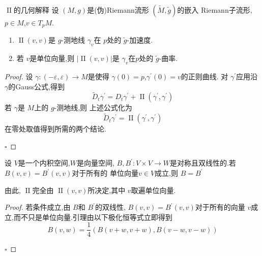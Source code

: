 \documentclass[../../几何与拓扑.tex]{subfiles}
\begin{document}
\begin{proposition}{\(  \operatorname{II}  \)的几何解释}
    设 \(  \left( M,g \right)   \)是(伪)Riemann流形 \(  \left( \tilde{M},\tilde{g}  \right)   \)的嵌入 Riemann子流形, \(  p \in M  \),\(  v\in T_{p}M  \).    
    \begin{enumerate}
        \item \(  \operatorname{II}\left( v,v \right)   \)是 \(  g  \)-测地线 \(   \gamma _v   \)在 \(  p  \)处的 \(  \tilde{g}   \)-加速度.
        \item 若 \(  v  \)是单位向量,则 \(  \left| \operatorname{II}\left( v,v \right)  \right|   \)是 \(   \gamma _v   \)在\(  p  \)处的 \(  \tilde{g}  \)-曲率.          
    \end{enumerate}
    
\end{proposition}
\begin{proof}
    设 \(   \gamma :\left( - \varepsilon , \varepsilon  \right)   \to M\)是使得 \(   \gamma \left( 0 \right)= p   \),\(   \gamma ^{\prime} \left( 0 \right)= v   \)的正则曲线.   对 \(   \gamma ^{\prime}   \)应用沿 \(   \gamma   \)的Gauss公式,得到 \[
    \tilde{D}_{t}  \gamma ^{\prime} = D_{t} \gamma ^{\prime} + \operatorname{II}\left(  \gamma ^{\prime} , \gamma ^{\prime}  \right) 
    \]若 \(   \gamma   \)是 \(  M  \)上的 \(  g  \)-测地线,则 上述公式化为 \[
    \tilde{D}_{t} \gamma ^{\prime} = \operatorname{II}\left(  \gamma ^{\prime} , \gamma ^{\prime}  \right) 
    \]在零处取值得到所需的两个结论.     

    \hfill $\square$
\end{proof}

\begin{lemma}
    设 \(  V  \)是一个内积空间,\(  W  \)是向量空间, \(  B,B^{\prime} :V\times V\to W  \)是对称且双线性的.若 \(  B\left( v,v \right)= B^{\prime} \left( v,v \right)    \)对于所有的 单位向量\(  v \in V  \)成立,则 \(  B= B^{\prime}   \)      
\end{lemma}
\begin{remark}
    由此, \(  \operatorname{II}  \)完全由 \(  \operatorname{II}\left( v,v \right)   \)所决定,其中 \(  v  \)取遍单位向量.   
\end{remark}

\begin{proof}
    若条件成立,由 \(  B  \)和 \(  B^{\prime}   \)的双线性, \(  B\left( v,v \right)= B^{\prime} \left( v,v \right)    \)对于所有的向量 \(  v  \)成立,而不只是单位向量.引理由以下极化恒等式立即得到 \[
    B\left( v,w \right)=  \frac{1 }{4 } \left( B\left( v+ w,v+ w \right),B\left( v-w,v-w \right)   \right)   
    \]    

    \hfill $\square$
\end{proof}
\end{document}
